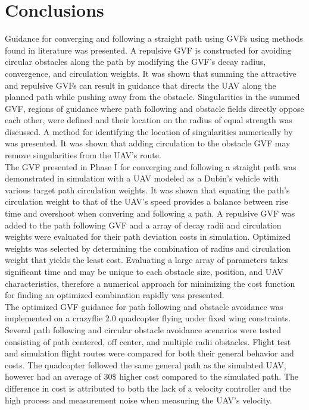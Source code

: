 \documentclass[numbered,pdftex]{ohio-etd}
\begin{document}
\chapter{Conclusions}


Guidance for converging and following a straight path using GVFs using methods found in literature was presented. A repulsive GVF is constructed for avoiding circular obstacles along the path by modifying the GVF's decay radius, convergence, and circulation weights.  It was shown that summing the attractive and repulsive GVFs can result in guidance that directs the UAV along the planned path while pushing away from the obstacle. Singularities in the summed GVF, regions of guidance where path following and obstacle fields directly oppose each other, were defined and their location on the radius of equal strength was discussed. A method for identifying the location of singularities numerically by was presented. It was shown that adding circulation to the obstacle GVF may remove singularities from the UAV’s route. \\

The GVF presented in Phase I for converging and following a straight path was demonstrated in simulation with a  UAV modeled as a Dubin's vehicle with various target path circulation weights. It was shown that equating the path’s circulation weight to that of the UAV’s speed provides a balance between rise time and overshoot when convering and following a path. A repulsive GVF was added to the path following GVF and a array of decay radii and circulation weights were evaluated for their path deviation costs in simulation. Optimized weights was selected by determining the combination of radius and circulation weight that yields the least cost. Evaluating a large array of parameters takes significant time and may be unique to each obstacle size, position, and UAV characteristics, therefore a numerical approach for minimizing the cost function for finding an optimized combination rapidly was presented. \\

The optimized GVF guidance for path following and obstacle avoidance was implemented on a crazyflie 2.0 quadcopter flying under fixed wing constraints. Several path following and circular obstacle avoidance scenarios were tested consisting of path centered, off center, and multiple radii obstacles. Flight test and simulation flight routes were compared for both their general behavior and costs. The quadcopter followed the same general path as the simulated UAV, however had an average of $30 \$$ higher cost compared to the simulated path. The difference in cost is attributed to both the lack of a velocity controller and the high process and measurement noise when measuring the UAV’s velocity. 
\end{document}

